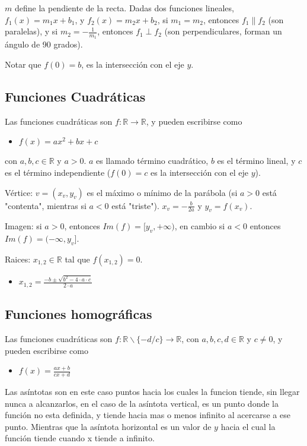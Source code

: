\documentclass[%
 aip,
 jmp,%
 amsmath,amssymb,
 reprint,%
]{revtex4-1}
\begin{document}
 $m$ define la pendiente de la recta. Dadas dos funciones lineales, $f_1(x) = m_1 x + b_1$, y $f_2(x) = m_2 x + b_2$, si $m_1 = m_2$, entonces $f_1 \parallel f_2$ (son paralelas), y si $m_2=-\frac{1}{m_1}$, entonces $f_1 \perp f_2$ (son perpendiculares, forman un ángulo de 90 grados).
 
 Notar que $f(0)=b$, es la intersección con el eje $y$.
 
\subsection{Funciones Cuadráticas}
Las funciones cuadráticas son $f: \mathbb{R} \rightarrow \mathbb{R}$, y pueden escribirse como
\begin{itemize}
\item $f(x)= a x^2 + b x + c$
\end{itemize}
con $a,b,c \in \mathbb{R}$ y $a>0$. $a$ es llamado término cuadrático, $b$ es el término lineal, y $c$ es el término independiente ($f(0)=c$ es la intersección con el eje $y$).

Vértice: $v=(x_v,y_v)$ es el máximo o mínimo de la parábola (si $a>0$ está "contenta", mientras si $a<0$ está "triste"). $ x_v=-\frac{b}{2a}$ y $y_v=f(x_v)$.

Imagen: si $a>0$, entonces $Im(f)=[y_v,+\infty)$, en cambio si $a<0$ entonces $Im(f)=(-\infty,y_v]$.

Raices: $x_{1,2} \in \mathbb{R}$ tal que $f(x_{1,2})=0$. 
\begin{itemize}
\item $ x_{1,2}=\frac{-b \pm \sqrt{b^2 - 4 \cdot a \cdot c}}{2\cdot a}$
\end{itemize}

\subsection{Funciones homográficas}
Las funciones cuadráticas son $f: \mathbb{R} \smallsetminus \{-d/c\} \rightarrow \mathbb{R}$, con $a,b,c,d \in \mathbb{R}$ y $c \neq 0$, y pueden escribirse como
\begin{itemize}
\item $ f(x)= \frac{a  x + b}{c  x + d}$
\end{itemize}

Las asíntotas son en este caso puntos hacia los cuales la funcion tiende, sin llegar nunca a alcanzarlos, en el caso de la asíntota vertical, es un punto donde la función no esta definida, y tiende hacia mas o menos infinito al acercarse a ese punto. Mientras que la asíntota horizontal es un valor de $y$ hacia el cual la función tiende cuando x tiende a infinito.
\end{document}
